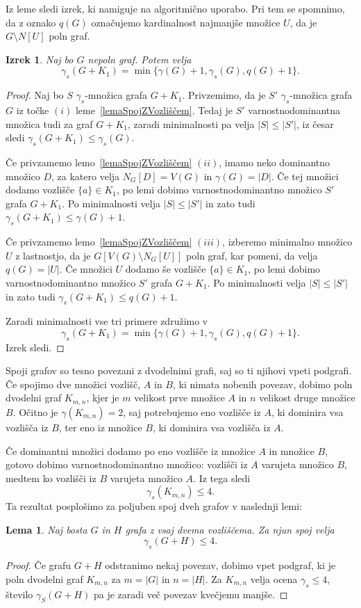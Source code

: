 \documentclass[12pt,a4paper,twoside]{article}
\theoremstyle{definition} %
\theoremstyle{plain} %
\newtheorem{lema}[definicija]{Lema}
\newtheorem{izrek}[definicija]{Izrek}
\numberwithin{equation}{section}  %
\begin{document}
Iz leme sledi izrek, ki namiguje na algoritmično uporabo. Pri tem se spomnimo, da z oznako $q(G)$ označujemo kardinalnost najmanjše množice $U$, da je $G \setminus N[U]$ poln graf.
\begin{izrek}\label{theorem3.5}{\rm{\cite[Corollary 2.10]{castillano2014secure}}}
Naj bo $G$ nepoln graf. Potem velja $$\gamma_s(G + K_1) = \min\{\gamma(G) + 1, \gamma_s(G), q(G) + 1\}.$$
\end{izrek}
\begin{proof}
Naj bo $S$ $\gamma_s$-množica grafa $G + K_1$. Privzemimo, da je $S'$ $\gamma_s$-množica grafa $G$ iz točke $(i)$ leme~\ref{lemaSpojZVozliščem}. Tedaj je $S'$ varnostnodominantna množica tudi za graf $G + K_1$, zaradi minimalnosti pa velja $|S| \leq |S'|$, iz česar sledi $\gamma_s(G + K_1) \leq \gamma_s(G)$. 

Če privzamemo lemo~\ref{lemaSpojZVozliščem} $(ii)$, imamo neko dominantno množico $D$, za katero velja $N_G[D] = V(G)$ in $\gamma(G) = |D|$. Če tej množici dodamo vozlišče $\{a\} \in K_1$, po lemi dobimo varnostnodominantno množico $S'$ grafa $G + K_1$. Po minimalnosti velja $|S| \leq |S'|$ in zato tudi $\gamma_s(G + K_1) \leq \gamma(G) + 1$.

Če privzamemo lemo~\ref{lemaSpojZVozliščem} $(iii)$, izberemo minimalno množico $U$ z lastnostjo, da je $G[V(G) \setminus N_G[U]]$ poln graf, kar pomeni, da velja $q(G) = |U|$. Če množici $U$ dodamo še vozlišče $\{a\} \in K_1$, po lemi dobimo varnostnodominantno množico $S'$ grafa $G + K_1$. Po minimalnosti velja $|S| \leq |S'|$ in zato tudi $\gamma_s(G + K_1) \leq q(G) + 1$.

\medskip
Zaradi minimalnosti vse tri primere združimo v $$\gamma_s(G + K_1) = \min\{\gamma(G) + 1, \gamma_s(G), q(G) + 1\}.$$
Izrek sledi.\end{proof}

Spoji grafov so tesno povezani z dvodelnimi grafi, saj so ti njihovi vpeti podgrafi. Če spojimo dve množici vozlišč, $A$ in $B$, ki nimata nobenih povezav, dobimo poln dvodelni graf $K_{m,n}$, kjer je $m$ velikost prve množice $A$ in $n$ velikost druge množice $B$. Očitno je $\gamma(K_{m,n}) = 2$, saj potrebujemo eno vozlišče iz $A$, ki dominira vsa vozlišča iz $B$, ter eno iz množice $B$, ki dominira vsa vozlišča iz $A$.


Če dominantni množici dodamo po eno vozlišče iz množice $A$ in množice $B$, gotovo dobimo varnostnodominantno množico: vozlišči iz $A$ varujeta množico $B$, medtem ko vozlišči iz $B$ varujeta množico $A$. Iz tega sledi
$$\gamma_s(K_{m,n}) \leq 4.$$
Ta rezultat posplošimo za poljuben spoj dveh grafov v naslednji lemi:
\begin{lema} \label{lemma3.6}
Naj bosta $G$ in $H$ grafa z vsaj dvema vozliščema. Za njun spoj velja $$\gamma_s(G + H) \leq 4.$$
\end{lema}
\begin{proof}
Če grafu $G + H$ odstranimo nekaj povezav, dobimo vpet podgraf, ki je poln dvodelni graf $K_{m,n}$ za $m = |G|$ in $n = |H|$. Za $K_{m,n}$ velja ocena $\gamma_s \leq 4$, število $\gamma_S(G + H)$ pa je zaradi več povezav kvečjemu manjše.\end{proof}
\end{document}
